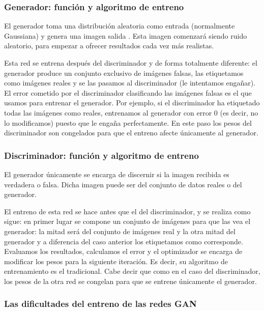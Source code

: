 \documentclass[../main.tex]{subfiles}
\begin{document}
\subsubsection{Generador: función y algoritmo de entreno}

El generador toma una distribución aleatoria como entrada (normalmente Gaussiana) y genera una imagen salida \cite{Geron2019}. Esta imagen comenzará siendo ruido aleatorio, para empezar a ofrecer resultados cada vez más realistas. \newline

Esta red se entrena después del discriminador y de forma totalmente diferente: el generador produce un conjunto exclusivo de imágenes falsas, las etiquetamos como imágenes reales y se las pasamos al discriminador (le intentamos engañar). El error cometido por el discriminador clasificando las imágenes falsas es el que usamos para entrenar el generador. Por ejemplo, si el discriminador ha etiquetado todas las imágenes como reales, entrenamos al generador con error 0 (es decir, no lo modificamos) puesto que le engaña perfectamente. En este paso los pesos del discriminador son congelados para que el entreno afecte únicamente al generador.

\subsubsection{Discriminador: función y algoritmo de entreno}

El generador únicamente se encarga de discernir si la imagen recibida es verdadera o falsa. Dicha imagen puede ser del conjunto de datos reales o del generador. \newline

El entreno de esta red se hace antes que el del discriminador, y se realiza como sigue: en primer lugar se compone un conjunto de imágenes para que las vea el generador: la mitad será del conjunto de imágenes real y la otra mitad del generador y a diferencia del caso anterior los etiquetamos como corresponde. Evaluamos los resultados, calculamos el error y el optimizador se encarga de modificar los pesos para la siguiente iteración. Es decir, su algoritmo de entrenamiento es el tradicional. Cabe decir que como en el caso del discriminador, los pesos de la otra red se congelan para que se entrene únicamente el generador.

\subsubsection{Las dificultades del entreno de las redes GAN}
\end{document}
